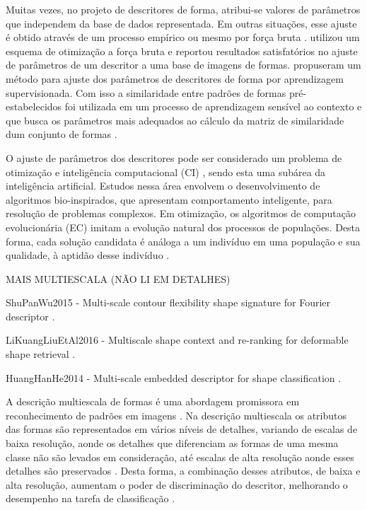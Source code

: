 Muitas vezes, no projeto de descritores de forma, atribui-se valores de parâmetros que independem da base de dados representada. Em outras situações, esse ajuste é obtido através de um processo empírico ou mesmo por força bruta \cite{mokhtarian1998robust, Ling:2007:SCU:1191552.1191806, Wang2012134}.  utilizou um esquema de otimização a força bruta e reportou resultados satisfatórios no ajuste de parâmetros de um descritor a uma base de imagens de formas.   propuseram um método para ajuste dos parâmetros de descritores de forma por aprendizagem supervisionada. Com isso a similaridade entre padrões de formas pré-estabelecidos foi utilizada em um processo de aprendizagem sensível ao contexto e que busca os parâmetros mais adequados ao cálculo da matriz de similaridade dum conjunto de formas \cite{4815272}.

O ajuste de parâmetros dos descritores pode ser considerado um problema de otimização e inteligência computacional (CI) \cite{Andries:2007}, sendo esta uma subárea da inteligência artificial. Estudos nessa área envolvem o desenvolvimento de algoritmos bio-inspirados, que apresentam comportamento inteligente, para resolução de problemas complexos. Em otimização, os algoritmos de computação evolucionária (EC) imitam a evolução natural dos processos de populações. Desta forma, cada solução candidata é análoga a um indivíduo em uma população e sua qualidade, à aptidão desse indivíduo \cite{Eiben:2015}.

{\color{red}
MAIS MULTIESCALA (NÃO LI EM DETALHES)

ShuPanWu2015 - Multi-scale contour flexibility shape signature for Fourier descriptor
 \cite{ShuPanWu2015}.

LiKuangLiuEtAl2016 - Multiscale shape context and re-ranking for deformable shape retrieval
 \cite{LiKuangLiuEtAl2016}.

HuangHanHe2014 - Multi-scale embedded descriptor for shape classification
\cite{HuangHanHe2014}.
}

A descrição multiescala de formas \cite{LiKuangLiuEtAl2016,ShuPanWu2015, HuangHanHe2014, Costa:2009} é uma abordagem promissora em reconhecimento de padrões em imagens \cite{Direkoglu:2011}. Na descrição multiescala os atributos das formas são representados em vários níveis de detalhes, variando de escalas de baixa resolução, aonde os detalhes que diferenciam as formas de uma mesma classe não são levados em consideração, até escalas de alta resolução aonde esses detalhes são preservados \cite{Ullman:1996}. Desta forma, a combinação desses atributos, de baixa e alta resolução, aumentam o poder de discriminação do descritor, melhorando o desempenho na tarefa de classificação \cite{Direkoglu:2011}.

